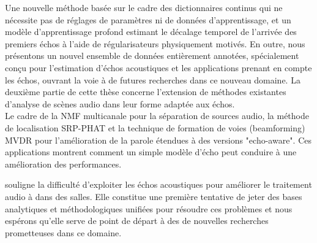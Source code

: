     Une nouvelle méthode basée sur le cadre des dictionnaires continus qui ne nécessite pas de réglages de paramètres ni de données d'apprentissage,
    et un modèle d'apprentissage profond estimant le décalage temporel de l'arrivée des premiers échos à l'aide de régularisateurs physiquement motivés.
    En outre, nous présentons un nouvel ensemble de données entièrement annotées, spécialement conçu pour l'estimation d'échos acoustiques et les applications prenant en compte les échos, ouvrant la voie à de futures recherches dans ce nouveau domaine.
    La deuxième partie de cette thèse concerne l'extension de méthodes existantes d'analyse de scènes audio dans leur forme adaptée aux échos.
    \\Le cadre de la NMF multicanale pour la séparation de sources audio, la méthode de localisation SRP-PHAT et la technique de formation de voies (beamforming) MVDR pour l'amélioration de la parole
    étendues à des versions "echo-aware". Ces applications montrent comment un simple modèle d'écho peut conduire à une amélioration des performances.

     souligne la difficulté d'exploiter les échos acoustiques pour améliorer le traitement audio à dans des salles.
    Elle constitue une première tentative de jeter des bases analytiques et méthodologiques unifiées pour résoudre ces problèmes et nous espérons qu'elle serve de point de départ à des de nouvelles recherches prometteuses dans ce domaine.